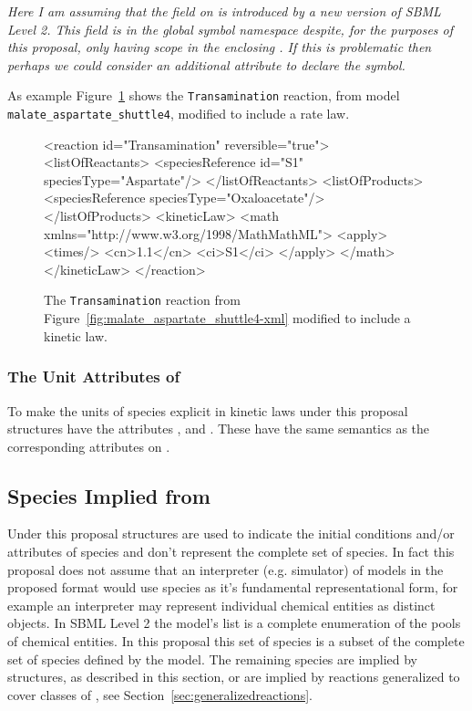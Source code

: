 \documentclass{cekarticle}
\begin{document}
\emph{Here I am assuming that the  field on  is introduced by a
new version of SBML Level 2. This  field is in the global symbol
namespace despite, for the purposes of this proposal, only having scope in the enclosing
.  If this is problematic then perhaps we could consider an additional attribute to
declare the symbol.}

As example Figure~\ref{fig:Transamination-xml} shows the \texttt{Transamination} reaction, from model
\texttt{malate\_aspartate\_shuttle4}, modified to include a rate law.

\begin{figure}[h]
\begin{example}
<reaction id="Transamination" reversible="true">
    <listOfReactants>
        <speciesReference id="S1" speciesType="Aspartate"/>
    </listOfReactants>
    <listOfProducts>
        <speciesReference speciesType="Oxaloacetate"/>
    </listOfProducts>
    <kineticLaw>
        <math xmlns="http://www.w3.org/1998/MathMathML">
            <apply>
                <times/>
                <cn>1.1</cn>
                <ci>S1</ci>
            </apply>
        </math>
    </kineticLaw>
</reaction>
\end{example}
\caption{The \texttt{Transamination} reaction from
Figure~\ref{fig:malate_aspartate_shuttle4-xml} modified to include a kinetic law.}
\label{fig:Transamination-xml}
\end{figure}

\subsubsection{The Unit Attributes of }

To make the units of species explicit in kinetic laws under this
proposal  structures have the
attributes ,  and
.  These have the same semantics as
the corresponding attributes on .

\subsection{Species Implied from }

Under this proposal  structures are used to
indicate the initial conditions and/or attributes of species and
don't represent the complete set of species.  In fact this
proposal does not assume that an interpreter (e.g. simulator) of
models in the proposed format would use species as it's
fundamental representational form, for example an interpreter may
represent individual chemical entities as distinct objects. In
SBML Level 2 the model's  list is a complete
enumeration of the pools of chemical entities.  In this proposal
this set of species is a subset of the complete set of species
defined by the model. The remaining species are implied by
 structures, as described in this section, or
are implied by reactions generalized to cover classes of
, see Section~\ref{sec:generalizedreactions}.
\end{document}
